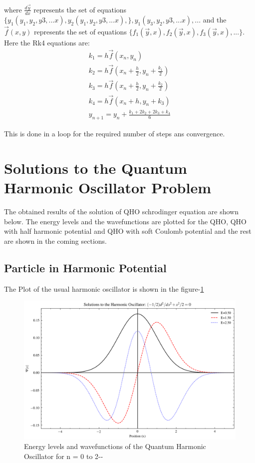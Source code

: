 \documentclass{article}
\begin{document}
\begin{multicols}{2}
where $\frac{d\vec{y}}{dx}$ represents the set of equations $\{ y_1(y_1,y_2,y3,...x) ,y_2(y_1,y_2,y3,...x) , \},y_1(y_3,y_2,y3,...x),...$  and the $\vec{f}(x,y)$ represents the set of equations $\{ f_1(\vec{y},x),f_2(\vec{y},x),f_3(\vec{y},x),... \}$. Here the Rk4 equations are:
\begin{eqnarray}
    k_1 = h\vec{f}(x_n,y_n)\\
    k_2 = h\vec{f}(x_n + \frac{h}{2},y_n + \frac{k_1}{2})\\
    k_3 = h\vec{f}(x_n + \frac{h}{2},y_n + \frac{k_2}{2})\\
    k_4 = h\vec{f}(x_n + h,y_n + k_3)\\
    y_{n+1} = y_n + \frac{k_1 + 2k_2 + 2k_3 + k_4}{6}
\end{eqnarray}

This is done in a loop for the required number of steps ans convergence. 
\section{\label{observations}Solutions to the Quantum Harmonic Oscillator Problem}


The obtained results of the solution of QHO schrodinger equation are shown below. The energy levels and the wavefunctions are plotted for the QHO, QHO with half harmonic potential and QHO with soft Coulomb potential and the rest are shown in the coming sections.


\subsection{\label{QHO_1}Particle in Harmonic Potential}

The Plot of the usual harmonic oscillator is shown in the figure-\ref{usualqho}


\begin{figure}[H]
    \centering
    \includegraphics[width = \columnwidth]{Images/usual_QHO.png}
    \caption{Energy levels and wavefunctions of the Quantum Harmonic Oscillator for n = 0 to 2-\cite{python}-\cite{SciencePlots}}
    \label{usualqho}
\end{figure}


\end{multicols}
\end{document}
